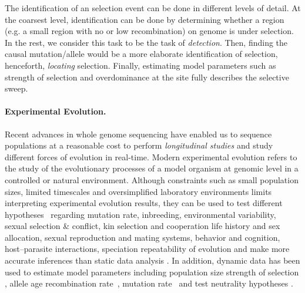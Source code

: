 \documentclass[11pt]{article}
\begin{document}
The identification of an selection event can be done in different
levels of detail. At the coarsest level, identification can be done by
determining whether a region (e.g. a small region with no or low
recombination) on genome is under selection.  In the rest, we consider
this task to be the task of \emph{detection}.  Then, finding the
causal mutation/allele would be a more elaborate identification of
selection, henceforth, \emph{locating} selection.  Finally, estimating
model parameters such as strength of selection and overdominance at
the site fully describes the selective sweep.



\paragraph{Experimental Evolution.}
Recent advances in whole genome sequencing have enabled us to sequence
populations at a reasonable cost to perform \emph{longitudinal
  studies} and study different forces of evolution in
real-time. Modern experimental evolution refers to the study of the
evolutionary processes of a model organism at genomic level in a
controlled
\cite{hegreness2006equivalence,lang2013pervasive,orozco2012adaptation,
  lang2011genetic,barrick2009genome,bollback2007clonal,oz2014strength}
or natural
\cite{maldarelli2013hiv,reid2011new,denef2012situ,winters2012development,
  daniels2013genetic,barrett2008natural,bergland2014genomic}
environment.  Although constraints such as small population sizes,
limited timescales and oversimplified laboratory environments limits
interpreting experimental evolution results, they can be used to test
different hypotheses~\cite{kawecki2012experimental} regarding mutation
rate, inbreeding, environmental variability, sexual selection \&
conflict, kin selection and cooperation life history and sex
allocation, sexual reproduction and mating systems, behavior and
cognition, host–parasite interactions, speciation repeatability of
evolution and make more accurate inferences than static data analysis
\cite{boyko2008assessing,desai2008polymorphism,sawyer1992population}. In
addition, dynamic data has been used to estimate model parameters
including population size
\cite{williamson1999using,wang2001pseudo,pollak1983new,waples1989generalized,
  Terhorst2015Multi} strength of selection
\cite{mathieson2013estimating,illingworth2011distinguishing,Terhorst2015Multi,
  bollback2008estimation,illingworth2012quantifying,malaspinas2012estimating,
  Steinrücken2014a}, allele age \cite{malaspinas2012estimating}
recombination rate~\cite{Terhorst2015Multi}, mutation
rate~\cite{Barrick2013Genome, Terhorst2015Multi} and test neutrality
hypotheses
\cite{feder2014Identifying,Terhorst2015Multi,burke2010genome,bergland2014genomic}.
\end{document}
